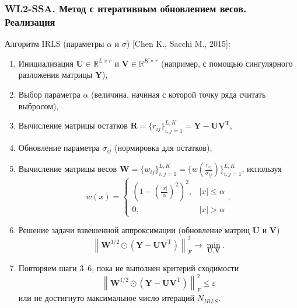 \documentclass[10pt, ucs, notheorems, handout]{beamer}
\newcommand{\norm}[1]{\left\lVert#1\right\rVert}
\begin{document}
\begin{frame}
\frametitle{WL2-SSA. Метод с итеративным обновлением весов. Реализация}
\alert{Алгоритм IRLS} (параметры $\alpha$ и $\sigma$) [Chen K., Sacchi M., 2015]:\\
\footnotesize {
	\begin{enumerate}
		\item Инициализация $\mathbf{U}\in \mathbb{R}^{L\times r}$ и $\mathbf{V}\in \mathbb{R}^{K\times r}$ (например, с помощью сингулярного разложения матрицы $\mathbf{Y}$),
		\item Выбор параметра $\alpha$ (величина, начиная с которой точку ряда считать выбросом),
		\item  Вычисление матрицы остатков $\mathbf{R}=\{r_{ij}\}_{i,j=1}^{L,K} = \mathbf{Y}-\mathbf{U}\mathbf{V}^{\mathrm{T}}$,
		\item  Обновление параметра $\sigma_{ij}$ (нормировка для остатков),
		\item Вычисление матрицы весов $\mathbf{W} = \{w_{ij}\}_{i,j=1}^{L,K} = \{w(\frac{r_{ij}}{\sigma_{ij}})\}_{i,j=1}^{L,K} $, используя %
		\begin{equation*}
		w(x) = 
		\begin{cases}
		(1-(\frac{|x|}{\alpha})^2)^2, &|x|\le\alpha\\
		0, &|x|>\alpha
		\end{cases},%
		\end{equation*}
		\item Решение задачи взвешенной аппроксимации (обновление матриц $\mathbf{U}$ и $\mathbf{V}$)
		\begin{equation*}
		\norm{\mathbf{W}^{1/2}\odot(\mathbf{Y}-\mathbf{U}\mathbf{V}^{\mathrm{T}})}^2_F \longrightarrow \min_{\mathbf{U},\mathbf{V}}.
		\end{equation*}	
		
		\item Повторяем шаги 3--6, пока не выполнен критерий сходимости
		\begin{equation*}
		\norm{\mathbf{W}^{1/2}\odot(\mathbf{Y}-\mathbf{U}\mathbf{V}^{\mathrm{T}})}^2_F \le \varepsilon
		\end{equation*} 
		или не достигнуто максимальное число итераций $N_{IRLS}$.
	\end{enumerate}
}
\end{frame}
\end{document}
